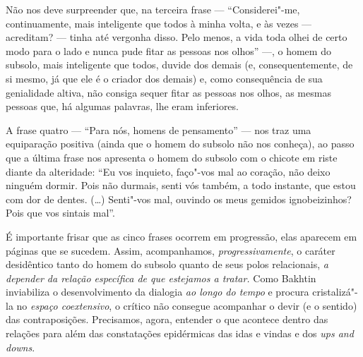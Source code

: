 Não nos deve surpreender que, na terceira frase --- ``Considerei"-me,
continuamente, mais inteligente que todos à minha volta, e às vezes ---
acreditam? --- tinha até vergonha disso. Pelo menos, a vida toda olhei de
certo modo para o lado e nunca pude fitar as pessoas nos olhos'' ---, o
homem do subsolo, mais inteligente que todos, duvide dos demais (e,
consequentemente, de si mesmo, já que ele é o criador dos demais) e,
como consequência de sua genialidade altiva, não consiga sequer fitar as
pessoas nos olhos, as mesmas pessoas que, há algumas palavras, lhe eram
inferiores.

A frase quatro --- ``Para nós, homens de pensamento'' --- nos traz uma
equiparação positiva (ainda que o homem do subsolo não nos conheça), ao
passo que a última frase nos apresenta o homem do subsolo com o chicote
em riste diante da alteridade: ``Eu vos inquieto, faço"-vos mal ao
coração, não deixo ninguém dormir. Pois não durmais, senti vós também, a
todo instante, que estou com dor de dentes. (\ldots) Senti"-vos mal, ouvindo
os meus gemidos ignobeizinhos? Pois que vos sintais mal''.

É importante frisar que as cinco frases ocorrem em progressão, elas
aparecem em páginas que se sucedem. Assim, acompanhamos,
\emph{progressivamente}, o caráter desidêntico tanto do homem do subsolo
quanto de seus polos relacionais, \emph{a depender da relação específica
de que estejamos a tratar.} Como Bakhtin inviabiliza o desenvolvimento
da dialogia \emph{ao longo do tempo} e procura cristalizá"-la no
\emph{espaço coextensivo}, o crítico não consegue acompanhar o devir (e
o sentido) das contraposições. Precisamos, agora, entender o que
acontece dentro das relações para além das constatações epidérmicas das
idas e vindas e dos \emph{ups and downs}.

